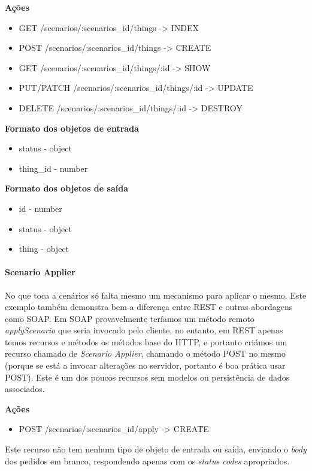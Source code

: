 \textbf{Ações}
\begin{itemize}
    \item GET /scenarios/:scenarios{\_}id/things -> INDEX
    \item POST /scenarios/:scenarios{\_}id/things -> CREATE
    \item GET /scenarios/:scenarios{\_}id/things/:id -> SHOW
    \item PUT/PATCH /scenarios/:scenarios{\_}id/things/:id -> UPDATE
    \item DELETE /scenarios/:scenarios{\_}id/things/:id -> DESTROY
\end{itemize}

\textbf{Formato dos objetos de entrada}
\begin{itemize}
    \item status - object
    \item thing{\_}id - number
\end{itemize}

\textbf{Formato dos objetos de saída}
\begin{itemize}
    \item id - number
    \item status - object
    \item thing - object
\end{itemize}

\paragraph*{Scenario Applier}

No que toca a cenários só falta mesmo um mecanismo para aplicar o mesmo. Este exemplo também demonstra bem a diferença entre REST e outras abordagens como SOAP. Em SOAP provavelmente teríamos um método remoto \textit{applyScenario} que seria invocado pelo cliente, no entanto, em REST apenas temos recursos e métodos os métodos base do HTTP, e portanto criámos um recurso chamado de \textit{Scenario Applier}, chamando o método POST no mesmo (porque se está a invocar alterações no servidor, portanto é boa prática usar POST). Este é um dos poucos recursos sem modelos ou persistência de dados associados.

\textbf{Ações}
\begin{itemize}
    \item POST /scenarios/:scenarios{\_}id/apply -> CREATE
\end{itemize}

Este recurso não tem nenhum tipo de objeto de entrada ou saída, enviando o \textit{body} dos pedidos em branco, respondendo apenas com os \textit{status codes} apropriados.

